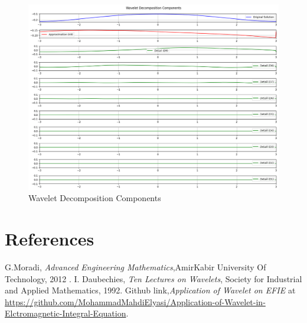 \documentclass[12pt]{article}
\begin{document}
\begin{figure}[h!]
    \centering
    \includegraphics[width=\textwidth]{3.png}
    \caption{Wavelet Decomposition Components}
\end{figure}

\newpage

\clearpage

\section{References}

\begin{thebibliography}{99}
     G.Moradi, \textit{Advanced Engineering Mathematics},AmirKabir University Of Technology, 2012 .
     I. Daubechies, \textit{Ten Lectures on Wavelets}, Society for Industrial and Applied Mathematics, 1992.
     Github link,\textit{Application of Wavelet on EFIE} at \url{https://github.com/MohammadMahdiElyasi/Application-of-Wavelet-in-Elctromagnetic-Integral-Equation}.

\end{thebibliography}
\end{document}

